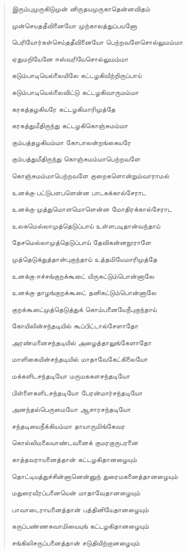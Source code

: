 \documentclass{article}
\begin{document}
\begin{quotation}
{இரும்புமுருகிடுமுன் னிருதயமுருகாதென்னவிதம்

முன்செயததீவினையோ முற்காலத்துப்பயனோ

பெரியோர்கள்‌செய்ததீவினையோ பெற்றவளேசொல்‌லுமம்மா

ஏதுமறியேனே ஈஸ்வரியேசொல்லுமம்மா

கடும்பாடியெல்லையிலே கட்டழகிவீற்றிருப்பாய்

கடும்பாடியெல்லைவிட்டு கட்டழகிவாருமம்மா

கரகத்தழகியரே கட்டழகிமாரிமுத்தே

கரகத்துமீதிருந்து கட்டழகிகொஞ்சுமம்மா

கும்பத்தழகியம்மா கோபாலன்றங்கையரே

கும்பத்துமீதிருந்து கொஞ்சுமம்மாபெற்றவளே

கொஞ்சுமம்மாபெற்றவளே குறைகளொன்றும்வாராமல்

உனக்கு-பட்டுபளபளென்ன பாடகக்கால்சேராட

உனக்கு-முத்துமொளமொளென்ன மோதிரக்கால்சேராட

உலகமெல்லாமுத்தெடுப்பாய் உள்ளபடிதான்வந்தாய்

தேசமெல்லாமுத்தெடுப்பாய் தேவிகன்னநூராளே

முத்தெடுக்துத்தான்புகுந்தாய் உத்தமியேமாரிமுத்தே

உனக்கு-ஈச்சங்குறக்கூடை் யிருகட்டும்பொன்னாலே

உனக்கு-தாழங்குறக்கூடை் தனிகட்டும்பொன்னாலே

குறக்கூடை்முத்தெடுத்துக் கொம்பனையேநீபுகுந்தாய்

கோயிலின்சந்தடியில் கூப்பிட்டால்சேளாதோ

அரண்மனைசந்தடியில் அழைத்தாலுங்கேளாதோ

மாளிகையின்சந்தடியில் மாதாவேகேட்கிலையோ

மக்களிடசந்தடியோ மருமககளசந்தடியோ

பிள்ளைகளிடசந்தடியோ பேரன்மார்சந்தடியோ

அனந்தல்பெருமையோ ஆசாரசந்தடியோ

சந்தடியைநீக்கியம்மா தாயாருமிங்கேவர

கொல்லிமலையாண்டவனைக் குமரகுருபரனை

காத்தவராயனைத்தான் கட்டழகிதானழையும்

தொட்டியத்துச்சின்னானென்னுந் துரைமகனைத்தானழையும்

மதுரைவீரப்பனையென் மாதாவேதானழையும்

பாவாடைராயனைத்தான் பத்தினியேதானழையும்

கருப்பண்ணசுவாமியையுங் கட்டழகிதானழையும்

சங்‌கிலிசருப்பனைத்தான்‌ சடுதியிற்றானழையும்

}
\end{quotation}
\end{document}
